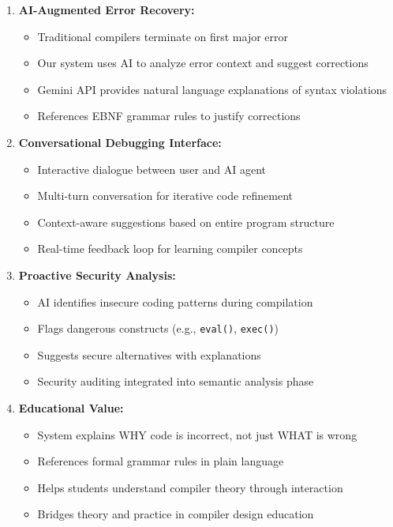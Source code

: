 \documentclass[a4paper,11pt]{article}
\begin{document}
\begin{enumerate}[leftmargin=*]
    \item \textbf{AI-Augmented Error Recovery:}
    \begin{itemize}
        \item Traditional compilers terminate on first major error
        \item Our system uses AI to analyze error context and suggest corrections
        \item Gemini API provides natural language explanations of syntax violations
        \item References EBNF grammar rules to justify corrections
    \end{itemize}
    
    \item \textbf{Conversational Debugging Interface:}
    \begin{itemize}
        \item Interactive dialogue between user and AI agent
        \item Multi-turn conversation for iterative code refinement
        \item Context-aware suggestions based on entire program structure
        \item Real-time feedback loop for learning compiler concepts
    \end{itemize}
    
    \item \textbf{Proactive Security Analysis:}
    \begin{itemize}
        \item AI identifies insecure coding patterns during compilation
        \item Flags dangerous constructs (e.g., \texttt{eval()}, \texttt{exec()})
        \item Suggests secure alternatives with explanations
        \item Security auditing integrated into semantic analysis phase
    \end{itemize}
    
    \item \textbf{Educational Value:}
    \begin{itemize}
        \item System explains WHY code is incorrect, not just WHAT is wrong
        \item References formal grammar rules in plain language
        \item Helps students understand compiler theory through interaction
        \item Bridges theory and practice in compiler design education
    \end{itemize}
\end{enumerate}
\end{document}
